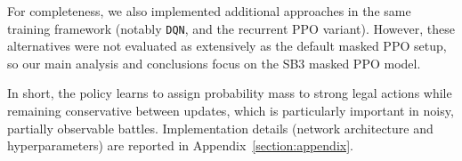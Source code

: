 For completeness, we also implemented additional approaches in the same training framework
(notably \texttt{DQN}, and the recurrent PPO variant). However, these alternatives were not evaluated as
extensively as the default masked PPO setup, so our main analysis and conclusions focus on the SB3 masked PPO model.

In short, the policy learns to assign probability mass to strong legal actions while remaining conservative
between updates, which is particularly important in noisy, partially observable battles.
Implementation details (network architecture and hyperparameters) are reported in Appendix~\ref{section:appendix}.